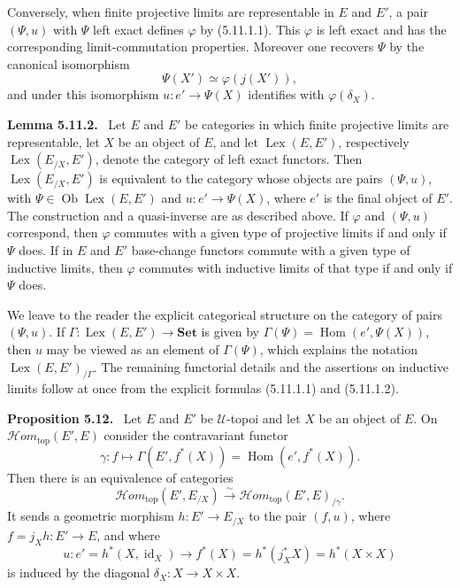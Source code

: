 \documentclass[11pt]{article}
\newcommand{\U}{\mathcal{U}}
\newcommand{\Set}{\mathbf{Set}}
\newcommand{\Hom}{\operatorname{Hom}}
\newcommand{\Ob}{\operatorname{Ob}}
\newcommand{\Ssex}{\operatorname{Lex}}
\newcommand{\Hhomtop}{\mathcal{H}om_{\mathrm{top}}}
\newenvironment{statement}[1]{\par\medskip\noindent\textbf{#1.}\ }{\par\medskip}
\begin{document}
Conversely, when finite projective limits are representable in \(E\) and \(E'\), a pair \((\Psi,u)\) with \(\Psi\) left exact defines \(\varphi\) by (5.11.1.1). This \(\varphi\) is left exact and has the corresponding limit-commutation properties. Moreover one recovers \(\Psi\) by the canonical isomorphism
\begin{equation*}
\Psi(X')\simeq \varphi(j(X')),\tag{5.11.1.2}
\end{equation*}
and under this isomorphism \(u:e'\to\Psi(X)\) identifies with \(\varphi(\delta_X)\).

\begin{statement}{Lemma 5.11.2}
Let \(E\) and \(E'\) be categories in which finite projective limits are representable, let \(X\) be an object of \(E\), and let \(\Ssex(E,E')\), respectively \(\Ssex(E_{/X},E')\), denote the category of left exact functors. Then \(\Ssex(E_{/X},E')\) is equivalent to the category whose objects are pairs \((\Psi,u)\), with \(\Psi\in\Ob\Ssex(E,E')\) and \(u:e'\to\Psi(X)\), where \(e'\) is the final object of \(E'\). The construction and a quasi-inverse are as described above. If \(\varphi\) and \((\Psi,u)\) correspond, then \(\varphi\) commutes with a given type of projective limits if and only if \(\Psi\) does. If in \(E\) and \(E'\) base-change functors commute with a given type of inductive limits, then \(\varphi\) commutes with inductive limits of that type if and only if \(\Psi\) does.
\end{statement}

We leave to the reader the explicit categorical structure on the category of pairs \((\Psi,u)\). If \(\Gamma:\Ssex(E,E')\to\Set\) is given by \(\Gamma(\Psi)=\Hom(e',\Psi(X))\), then \(u\) may be viewed as an element of \(\Gamma(\Psi)\), which explains the notation \(\Ssex(E,E')_{/\Gamma}\). The remaining functorial details and the assertions on inductive limits follow at once from the explicit formulas (5.11.1.1) and (5.11.1.2).

\begin{statement}{Proposition 5.12}
Let \(E\) and \(E'\) be \(\U\)-topoi and let \(X\) be an object of \(E\). On \(\Hhomtop(E',E)\) consider the contravariant functor
\[
\gamma:f\longmapsto \Gamma(E',f^*(X))=\Hom(e',f^*(X)).
\]
Then there is an equivalence of categories
\begin{equation*}
\Hhomtop(E',E_{/X})\xrightarrow{\sim}\Hhomtop(E',E)_{/\gamma}.\tag{5.12.1}
\end{equation*}
It sends a geometric morphism \(h:E'\to E_{/X}\) to the pair \((f,u)\), where \(f=j_Xh:E'\to E\), and where
\[
u:e'=h^*(X,\operatorname{id}_X)\longrightarrow f^*(X)=h^*(j_X^*X)=h^*(X\times X)
\]
is induced by the diagonal \(\delta_X:X\to X\times X\).
\end{statement}
\end{document}
